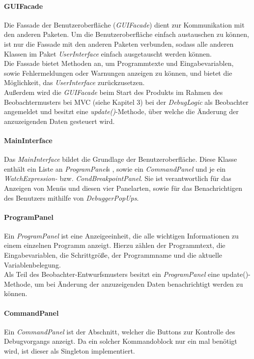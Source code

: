 \documentclass[parskip=full]{scrartcl}
\begin{document}
\paragraph{GUIFacade}
Die Fassade der Benutzeroberfläche (\textit{GUIFacade}) dient zur Kommunikation mit den anderen Paketen. Um die Benutzeroberfläche einfach austauschen zu können, ist nur die Fassade mit den anderen Paketen verbunden, sodass alle anderen Klassen im Paket \textit{UserInterface} einfach ausgetauscht werden können. \\
Die Fassade bietet Methoden an, um Programmtexte und Eingabevariablen, sowie Fehlermeldungen oder Warnungen anzeigen zu können, und bietet die Möglichkeit, das \textit{UserInterface} zurückzusetzen. \\
Außerdem wird die \textit{GUIFacade} beim Start des Produkts im Rahmen des Beobachtermusters bei MVC (siehe Kapitel 3) bei der \textit{DebugLogic} als Beobachter angemeldet und besitzt eine \textit{update()}-Methode, über welche die Änderung der anzuzeigenden Daten gesteuert wird.
\paragraph{MainInterface}
 Das \textit{MainInterface} bildet die Grundlage der Benutzeroberfläche. Diese Klasse enthält ein Liste an \textit{ProgramPanel}s , sowie ein \textit{CommandPanel} und je ein \textit{WatchExpression-} bzw. \textit{CondBreakpointPanel}. Sie ist verantwortlich für das Anzeigen von Menüs und diesen vier Panelarten, sowie für das Benachrichtigen des Benutzers mithilfe von \textit{DebuggerPopUps}. 
\paragraph{ProgramPanel}
Ein \textit{ProgramPanel} ist eine Anzeigeeinheit, die alle wichtigen Informationen zu einem einzelnen Programm anzeigt. Hierzu zählen der Programmtext, die Eingabevariablen, die Schrittgröße, der Programmname und die aktuelle Variablenbelegung. \\
Als Teil des Beobachter-Entwurfsmusters besitzt ein \textit{ProgramPanel} eine update()-Methode, um bei Änderung der anzuzeigenden Daten benachrichtigt werden zu können.
\paragraph{CommandPanel}
Ein \textit{CommandPanel} ist der Abschnitt, welcher die Buttons zur Kontrolle des Debugvorgangs anzeigt. Da ein solcher Kommandoblock nur ein mal benötigt wird, ist dieser als Singleton implementiert. 
\end{document}
